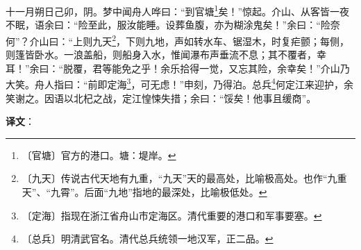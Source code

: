 \documentclass[12pt,UTF-8,openany]{ctexbook}
\begin{document}
\begin{normalsize}
    十一月朔日己卯，阴。梦中闻舟人哗曰：“到官塘\footnote{〔官塘〕官方的港口。塘：堤岸。}矣！”惊起。介山、从客皆一夜不眠，语余曰：“险至此，服汝能睡。设葬鱼腹，亦为糊涂鬼矣！”余曰：“险奈何”？介山曰：“上则九天\footnote{〔九天〕传说古代天地有九重，“九天”天的最高处，比喻极高处。也作“九重天”、“九霄”。后面“九地”指地的最深处，比喻极低处。}，下则九地，声如转水车、锯湿木，时复疟颤；每侧，则篷皆卧水。一浪盖船，则船身入水，惟闻瀑布声垂流不息；其不覆者，幸耳！”余曰：“脱覆，君等能免之乎！余乐拾得一觉，又忘其险，余幸矣！”介山乃大笑。舟人指曰：“前即定海\footnote{〔定海〕指现在浙江省舟山市定海区。清代重要的港口和军事要塞。}，可无虑！”申刻，乃得泊。总兵\footnote{〔总兵〕明清武官名。清代总兵统领一地汉军，正二品。}何定江来迎护，余笑谢之。因语以北杞之战，定江惶悚失措；余曰：“馁矣！他事且缓商”。
\end{normalsize}


\newpage

\textbf{译文}：

\vspace{1em}
\end{document}
